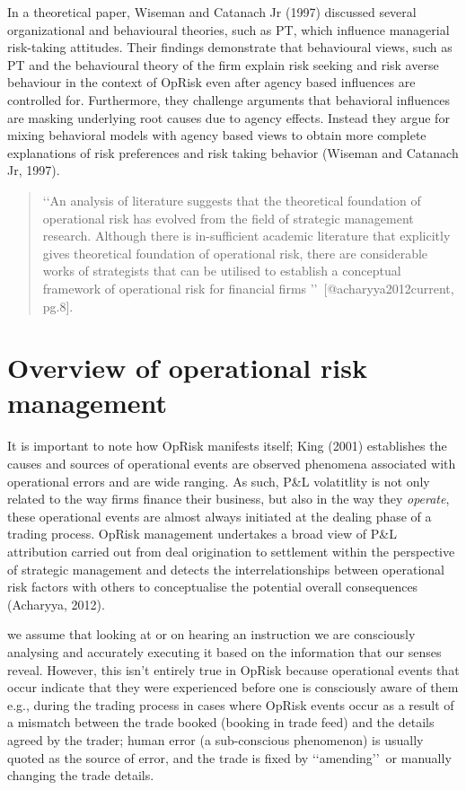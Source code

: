 \documentclass[]{DissertateUSU}
\begin{document}
In a theoretical paper, Wiseman and Catanach Jr (1997) discussed several
organizational and behavioural theories, such as PT, which influence
managerial risk-taking attitudes. Their findings demonstrate that
behavioural views, such as PT and the behavioural theory of the firm
explain risk seeking and risk averse behaviour in the context of OpRisk
even after agency based influences are controlled for. Furthermore, they
challenge arguments that behavioral influences are masking underlying
root causes due to agency effects. Instead they argue for mixing
behavioral models with agency based views to obtain more complete
explanations of risk preferences and risk taking behavior (Wiseman and
Catanach Jr, 1997). \medskip 

\begin{quote}
 \lq\lq An analysis of literature suggests that the theoretical foundation of operational risk has evolved from the field of strategic management research. Although there is in-sufficient academic literature that explicitly gives theoretical foundation of operational risk, there are considerable works of strategists that can be utilised to establish a conceptual framework of operational risk for financial firms \rq\rq\ [@acharyya2012current, pg.8].
\end{quote}

\section{Overview of operational risk management}
\label{sec:Overview of operational risk management}

It is important to note how OpRisk manifests itself; King (2001)
establishes the causes and sources of operational events are observed
phenomena associated with operational errors and are wide ranging. As
such, P\&L volatitlity is not only related to the way firms finance
their business, but also in the way they \emph{operate}, these
operational events are almost always initiated at the dealing phase of a
trading process. OpRisk management undertakes a broad view of P\&L
attribution carried out from deal origination to settlement within the
perspective of strategic management and detects the interrelationships
between operational risk factors with others to conceptualise the
potential overall consequences (Acharyya, 2012).\medskip

we assume that looking at or on hearing an instruction we are
consciously analysing and accurately executing it based on the
information that our senses reveal. However, this isn't entirely true in
OpRisk because operational events that occur indicate that they were
experienced before one is consciously aware of them e.g., during the
trading process in cases where OpRisk events occur as a result of a
mismatch between the trade booked (booking in trade feed) and the
details agreed by the trader; human error (a sub-conscious phenomenon)
is usually quoted as the source of error, and the trade is fixed by
\lq\lq amending\rq\rq~or manually changing the trade details. \medskip
\end{document}
